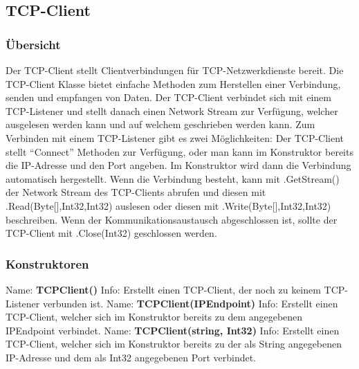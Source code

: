 \subsection{TCP-Client} \label{TCP-Client} %
\subsubsection{Übersicht}
Der TCP-Client stellt Clientverbindungen für TCP-Netzwerkdienste bereit. Die TCP-Client Klasse bietet einfache Methoden zum Herstellen einer Verbindung, senden und empfangen von Daten. Der TCP-Client verbindet sich mit einem TCP-Listener und stellt danach einen Network Stream zur Verfügung, welcher ausgelesen werden kann und auf welchem geschrieben werden kann. Zum Verbinden mit einem TCP-Listener gibt es zwei Möglichkeiten:
Der TCP-Client stellt “Connect” Methoden zur Verfügung, oder man kann im Konstruktor bereits die IP-Adresse und den Port angeben. Im Konstruktor wird dann die Verbindung automatisch hergestellt.
Wenn die Verbindung besteht, kann mit .GetStream() der Network Stream des TCP-Clients abrufen und diesen mit .Read(Byte[],Int32,Int32) auslesen oder diesen mit .Write(Byte[],Int32,Int32) beschreiben. Wenn der Kommunikationsaustausch abgeschlossen ist, sollte der TCP-Client mit .Close(Int32) geschlossen werden.
\subsubsection{Konstruktoren}
Name: \textbf{TCPClient()}
\newline
Info: Erstellt einen TCP-Client, der noch zu keinem TCP-Listener verbunden ist.
\newline
\newline
Name: \textbf{TCPClient(IPEndpoint)}
\newline
Info: Erstellt einen TCP-Client, welcher sich im Konstruktor bereits zu dem angegebenen IPEndpoint verbindet.
\newline
\newline
Name: \textbf{TCPClient(string, Int32)}
\newline
Info: Erstellt einen TCP-Client, welcher sich im Konstruktor bereits zu der als String angegebenen IP-Adresse und dem als Int32 angegebenen Port verbindet.
